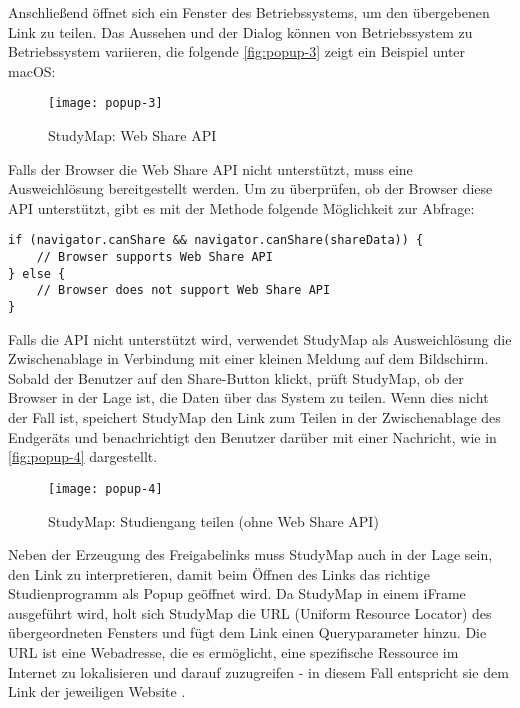 Anschließend öffnet sich ein Fenster des Betriebssystems, um den übergebenen Link zu teilen. Das Aussehen und der Dialog können von Betriebssystem zu Betriebssystem variieren, die folgende \autoref{fig:popup-3} zeigt ein Beispiel unter macOS:

\begin{figure}[H]
    \centering
    \texttt{[image: popup-3]}
    \caption{StudyMap: Web Share API}
    \label{fig:popup-3}
\end{figure}

Falls der Browser die Web Share API nicht unterstützt, muss eine Ausweichlösung bereitgestellt werden. Um zu überprüfen, ob der Browser diese API unterstützt, gibt es mit der Methode  folgende Möglichkeit zur Abfrage: \parencite{mozilla_corporation_web_2023}
\begin{lstlisting}[style=Python]
if (navigator.canShare && navigator.canShare(shareData)) {
    // Browser supports Web Share API
} else {
    // Browser does not support Web Share API
}
\end{lstlisting}

Falls die API nicht unterstützt wird, verwendet StudyMap als Ausweichlösung die Zwischenablage in Verbindung mit einer kleinen Meldung auf dem Bildschirm. Sobald der Benutzer auf den Share-Button klickt, prüft StudyMap, ob der Browser in der Lage ist, die Daten über das System zu teilen. Wenn dies nicht der Fall ist, speichert StudyMap den Link zum Teilen in der Zwischenablage des Endgeräts und benachrichtigt den Benutzer darüber mit einer Nachricht, wie in \autoref{fig:popup-4} dargestellt.

\begin{figure}[H]
    \centering
    \texttt{[image: popup-4]}
    \caption{StudyMap: Studiengang teilen (ohne Web Share API)}
    \label{fig:popup-4}
\end{figure}

Neben der Erzeugung des Freigabelinks muss StudyMap auch in der Lage sein, den Link zu interpretieren, damit beim Öffnen des Links das richtige Studienprogramm als Popup geöffnet wird. Da StudyMap in einem iFrame ausgeführt wird, holt sich StudyMap die URL (Uniform Resource Locator) des übergeordneten Fensters und fügt dem Link einen Queryparameter hinzu. Die URL ist eine Webadresse, die es ermöglicht, eine spezifische Ressource im Internet zu lokalisieren und darauf zuzugreifen - in diesem Fall entspricht sie dem Link der jeweiligen Website \parencite{mozilla_corporation_url_2023}.


